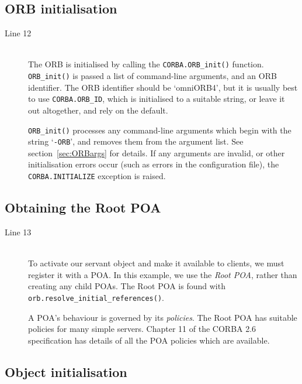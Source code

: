 \documentclass[draft,11pt,twoside,a4paper]{book}
\newcommand{\code}[1]{\texttt{#1}}
\newcommand{\op}[1]{\texttt{#1()}}
\newcommand{\cmdline}[1]{\texttt{#1}}
\newcommand{\term}[1]{\textit{#1}}
\newcommand{\dsc}{\discretionary{}{}{}}
\begin{document}
\subsection{ORB initialisation}

\begin{description}

\item[Line 12]\mbox{}\\
%
The ORB is initialised by calling the \op{CORBA.ORB\_init} function.
\op{ORB\_\dsc{}init} is passed a list of command-line arguments, and
an ORB identifier. The ORB identifier should be `omniORB4', but it is
usually best to use \code{CORBA.ORB\_ID}, which is initialised to a
suitable string, or leave it out altogether, and rely on the default.

\op{ORB\_init} processes any command-line arguments which begin with
the string `\cmdline{-ORB}', and removes them from the argument
list. See section~\ref{sec:ORBargs} for details. If any arguments are
invalid, or other initialisation errors occur (such as errors in the
configuration file), the \code{CORBA.INITIALIZE} exception is raised.

\end{description}

\subsection{Obtaining the Root POA}

\begin{description}

\item[Line 13]\mbox{}\\
%
To activate our servant object and make it available to clients, we
must register it with a POA. In this example, we use the \term{Root
POA}, rather than creating any child POAs. The Root POA is found with
\op{orb.resolve\_initial\_\dsc{}references}.

A POA's behaviour is governed by its \term{policies}. The Root POA has
suitable policies for many simple servers. Chapter 11 of the CORBA 2.6
specification \cite{corba26-spec} has details of all the POA policies
which are available.

\end{description}


\subsection{Object initialisation}
\end{document}
